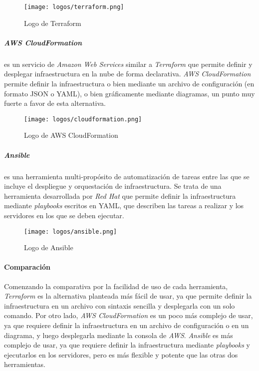 \begin{figure}[H]
	\centering
	\texttt{[image: logos/terraform.png]}
	\caption{Logo de Terraform~\textregistered}
	\label{fig:terraform}
\end{figure}

\subparagraph{AWS CloudFormation} es un servicio de \textit{Amazon Web Services}
similar a \textit{Terraform} que permite definir y desplegar infraestructura en
la nube de forma declarativa. \textit{AWS CloudFormation} permite definir la
infraestructura o bien mediante un archivo de configuración (en formato JSON o
YAML), o bien gráficamente mediante diagramas, un punto muy fuerte a favor de
esta alternativa.

\begin{figure}[H]
	\centering
	\texttt{[image: logos/cloudformation.png]}
	\caption{Logo de AWS CloudFormation~\textregistered}
	\label{fig:cloudformation}
\end{figure}

\subparagraph{Ansible} es una herramienta multi-propósito de automatización de tareas
entre las que se incluye el despliegue y orquestación de infraestructura. Se
trata de una herramienta desarrollada por \textit{Red Hat} que permite definir
la infraestructura mediante \textit{playbooks} escritos en YAML, que describen
las tareas a realizar y los servidores en los que se deben ejecutar.

\begin{figure}[H]
	\centering
	\texttt{[image: logos/ansible.png]}
	\caption{Logo de Ansible~\textregistered}
	\label{fig:ansible}
\end{figure}

\paragraph{Comparación}
Comenzando la comparativa por la facilidad de uso de cada herramienta,
\textit{Terraform} es la alternativa planteada más fácil de usar, ya que permite
definir la infraestructura en un archivo con sintaxis sencilla y desplegarla con
un solo comando. Por otro lado, \textit{AWS CloudFormation} es un poco más
complejo de usar, ya que requiere definir la infraestructura en un archivo de
configuración o en un diagrama, y luego desplegarla mediante la consola de
\textit{AWS}. \textit{Ansible} es más complejo de usar, ya que requiere definir
la infraestructura mediante \textit{playbooks} y ejecutarlos en los servidores,
pero es más flexible y potente que las otras dos herramientas.

